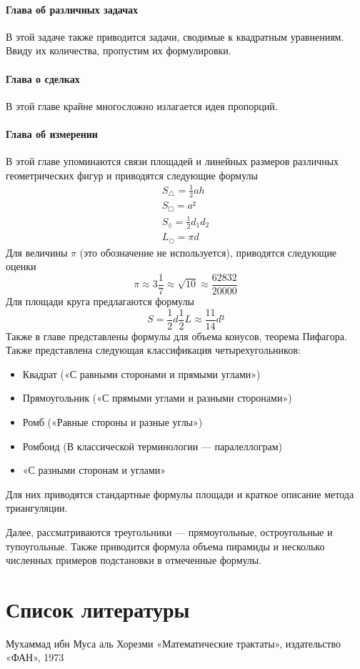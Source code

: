 \documentclass[unicode, 10pt, a4paper, oneside, fleqn]{article}
\newcommand{\half}{\ensuremath{{\scriptstyle\frac{1}{2}}}}
\begin{document}
\paragraph{Глава об различных задачах}
В этой задаче также приводится задачи, сводимые 
к квадратным уравнениям. Ввиду их количества,
пропустим их формулировки.
\paragraph{Глава о сделках}
В этой главе крайне многосложно излагается идея 
пропорций.
\paragraph{Глава об измерении}
В этой главе упоминаются связи площадей и линейных размеров 
различных геометрических фигур и приводятся следующие формулы
\begin{gather}
  S_△ = {\scriptstyle\frac{1}{2}}ah \\
  S_□ = a² \\
  S_◊ = {\scriptstyle\frac{1}{2}}d_1d_2 \\
  L_○= πd
\end{gather}
Для величины $π$ (это обозначение не используется),
приводятся следующие оценки 
\begin{displaymath}
  π≈3{\scriptstyle\frac{1}{7}}≈\sqrt{10} ≈\frac{62832}{20000}
\end{displaymath}
Для площади круга предлагаются формулы 
\begin{displaymath}
  S = \half d \half L ≈ \frac{11}{14}d²
\end{displaymath}
Также в главе представлены формулы для объема конусов, 
теорема Пифагора. Также представлена следующая классификация 
четырехугольников: 
\begin{itemize}
\item Квадрат («С равными сторонами и прямыми углами»)
\item Прямоугольник («С прямыми углами и разными сторонами»)
\item  Ромб («Равные стороны и разные углы»)
\item Ромбоид (В классической терминологии — паралеллограм)
\item «С разными сторонам и углами»
\end{itemize}
Для них приводятся стандартные формулы площади и 
краткое описание метода триангуляции.

Далее, рассматриваются треугольники — прямоугольные, 
остроугольные и тупоугольные. Также  приводится формула 
объема пирамиды и несколько численных примеров подстановки 
в отмеченные формулы.
\section{Список литературы}
\par 
Мухаммад ибн Муса аль Хорезми «Математические трактаты»,
издательство «ФАН», 1973
\end{document}
